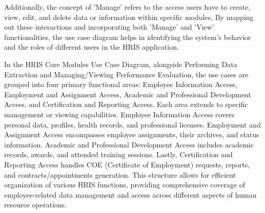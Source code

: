     Additionally, the concept of 'Manage' refers to the access users have to create, view, edit, and delete data or information within specific modules, By mapping out these interactions and incorporating both 'Manage' and 'View' functionalities, the use case diagram helps in identifying the system's behavior and the roles of different users in the HRIS application.

    In the HRIS Core Modules Use Case Diagram, alongside Performing Data Extraction and Managing/Viewing Performance Evaluation, the use cases are grouped into four primary functional areas: Employee Information Access, Employment and Assignment Access, Academic and Professional Development Access, and Certification and Reporting Access. Each area extends to specific management or viewing capabilities. Employee Information Access covers personal data, profiles, health records, and professional licenses. Employment and Assignment Access encompasses employee assignments, their archives, and status information. Academic and Professional Development Access includes academic records, awards, and attended training sessions. Lastly, Certification and Reporting Access handles COE (Certificate of Employment) requests, reports, and contracts/appointments generation. This structure allows for efficient organization of various HRIS functions, providing comprehensive coverage of employee-related data management and access across different aspects of human resource operations.

